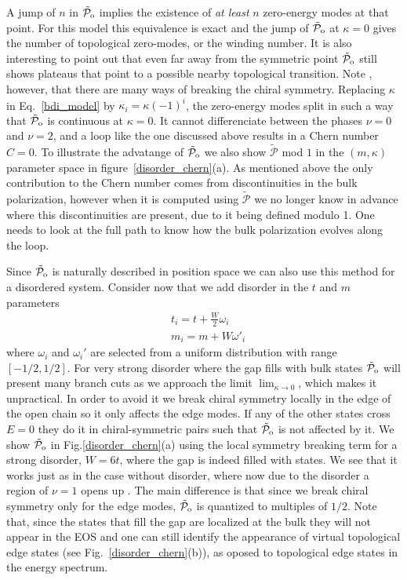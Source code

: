 \documentclass[twocolumn,amsmath,longbibliography,amssymb,superscriptaddress]{revtex4-1}
\newcommand{\tpo}{\tilde{\mathcal{P}}_{\rm o}}
\begin{document}
A jump of $n$ in $\tpo$ implies the existence of \emph{at least} $n$ zero-energy modes at that point. For this model this equivalence is exact and the jump of $\tpo$ at $\kappa = 0$ gives the number of topological zero-modes, or the winding number. It is also interesting to point out that even far away from the symmetric point $\tpo$ still shows plateaus that point to a possible nearby topological transition.
Note , however, that there are many ways of breaking the chiral symmetry. Replacing $\kappa$ in Eq.~\eqref{bdi_model} by $\kappa_i=\kappa (-1)^i$, the zero-energy modes split in such a way that $\tpo$ is continuous at $\kappa=0$. It cannot differenciate between the phases $\nu=0$ and $\nu=2$, and a loop like the one discussed above results in a Chern number $C=0$. To illustrate the advatange of $\tpo$ we also show $\tilde{\mathcal{P}}$ mod $1$ in the $(m,\kappa)$ parameter space in figure~\ref{disorder_chern}(a). As mentioned above the only contribution to the Chern number comes from discontinuities in the bulk polarization, however when it is computed using $\tilde{\mathcal{P}}$ we no longer know in advance where this discontinuities are present, due to it being defined modulo 1. One needs to look at the full path to know how the bulk polarization evolves along the loop. 

Since $\tpo$ is naturally described in position space we can also use this method for a disordered system. Consider now that we add disorder in the $t$ and $m$ parameters
\begin{align}
&t_i = t + \frac{W}{2} \omega_i \nonumber\\
&m_i = m + W \omega'_i
\end{align}
where $\omega_i$ and $\omega_i'$ are selected from a uniform distribution with range $[-1/2,1/2]$. For very strong disorder where the gap fills with bulk states $\tpo$ will present many branch cuts as we approach the limit $\lim_{\kappa \rightarrow 0}$, which makes it unpractical. In order to avoid it we break chiral symmetry locally in the edge of the open chain so it only affects the edge modes. If any of the other states cross $E=0$ they do it in  chiral-symmetric pairs such that $\tpo$ is not affected by it. We show $\tpo$ in Fig.\ref{disorder_chern}(a) using the local symmetry breaking term for a strong disorder, $W=6t$, where the gap is indeed filled with states. We see that it works just as in the case without disorder, where now due to the disorder a region of $\nu=1$ opens up \cite{Song2014}. The main difference is that since we break chiral symmetry only for the edge modes, $\tpo$ is quantized to multiples of $1/2$. Note that, since the states that fill the gap are localized at the bulk they will not appear in the EOS and one can still identify the appearance of virtual topological edge states (see Fig.~\ref{disorder_chern}(b)), as oposed to topological edge states in the energy spectrum.
\end{document}
